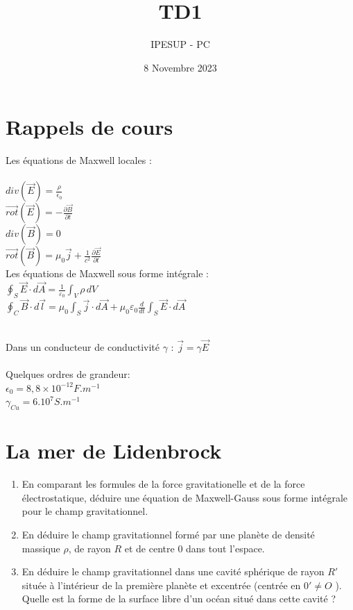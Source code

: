 \documentclass{article}
\title{TD1}
\author{IPESUP - PC }
\date{8 Novembre 2023}
\begin{document}
\maketitle


\section{Rappels de cours}
Les équations de Maxwell locales :\\
\\
\(div(\vec{E})=\frac{\rho}{\epsilon_0}\) \\
\(\vec{rot}(\vec{E}) = -\frac{\partial\vec{B}}{\partial t}\)\\
\(div(\vec{B})=0\) \\
\(\vec{rot}(\vec{B}) = \mu_0 \vec{j} + \frac{1}{c^2}\frac{\partial\vec{E}}{\partial t}\)\\

Les équations de Maxwell sous forme intégrale :\\


$\oint_S \vec{E} \cdot d\vec{A} = \frac{1}{\varepsilon_0} \int_V \rho \, dV$\\

$\oint_C \vec{B} \cdot d\vec{l} = \mu_0 \int_S \vec{j} \cdot d\vec{A} + \mu_0\varepsilon_0 \frac{d}{dt}\int_S \vec{E} \cdot d\vec{A}$

\\


Dans un conducteur de conductivité \(\gamma\) :  \(\vec{j} = \gamma\vec{E}\)
\\
\\
Quelques ordres de grandeur: \\
$\epsilon_0 = 8,8 \times 10^{-12} F.m^{-1}$\\
$ \gamma_{Cu}=6.10^7 S.m^{-1} $
 

\section{La mer de Lidenbrock}

\begin{enumerate}
    \item En comparant les formules de la force gravitationelle et de la force électrostatique, déduire une équation de Maxwell-Gauss sous forme intégrale pour le champ gravitationnel.
    \item En déduire le champ gravitationnel formé par une planète de densité massique $\rho$, de rayon $R$ et de centre $0$ dans tout l'espace.
    \item En déduire le champ gravitationnel dans une cavité sphérique de rayon $R'$ située à l'intérieur de la première planète et excentrée (centrée en $0' \neq O$ ). Quelle est la forme de la surface libre d'un océan situé dans cette cavité ? 
\end{enumerate}
\end{document}
